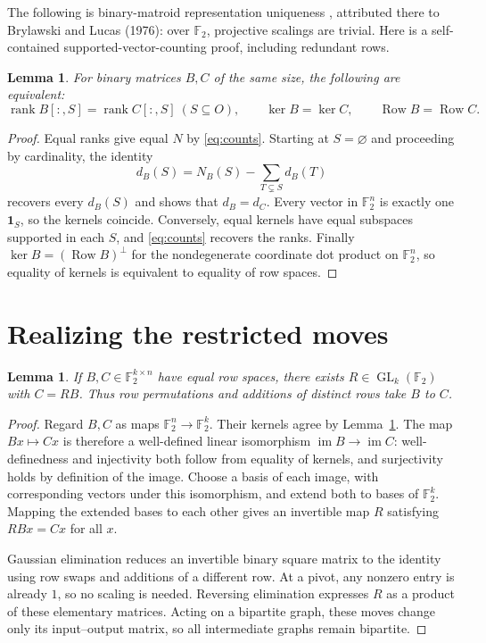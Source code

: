 \documentclass[11pt]{article}
\newtheorem{lemma}[theorem]{Lemma}
\newcommand{\F}{\mathbb F_2}
\newcommand{\rk}{\operatorname{rank}}
\newcommand{\Row}{\operatorname{Row}}
\newcommand{\GL}{\operatorname{GL}}
\begin{document}
The following is binary-matroid representation uniqueness
\cite[Proposition 6.6.5, p.~209]{Oxley}, attributed there to Brylawski
and Lucas (1976): over $\F$, projective scalings are trivial.
Here is a self-contained supported-vector-counting proof, including
redundant rows.
\begin{lemma}\label{lem:recovery}
For binary matrices $B,C$ of the same size, the following are equivalent:
\[
 \rk B[:,S]=\rk C[:,S]\ (S\subseteq O),\qquad
 \ker B=\ker C,\qquad \Row B=\Row C.
\]
\end{lemma}
\begin{proof}
Equal ranks give equal $N$ by \eqref{eq:counts}. Starting at $S=\varnothing$
and proceeding by cardinality, the identity
\[
 d_B(S)=N_B(S)-\sum_{T\subsetneq S}d_B(T)
\]
recovers every $d_B(S)$ and shows that $d_B=d_C$.
Every vector in $\F^n$ is exactly one $\mathbf1_S$, so the kernels coincide.
Conversely, equal kernels have equal subspaces supported in each $S$,
and \eqref{eq:counts} recovers the ranks. Finally
$\ker B=(\Row B)^\perp$ for the nondegenerate coordinate dot product on
$\F^n$, so equality of kernels is equivalent to equality of row spaces.
\end{proof}

\section{Realizing the restricted moves}
\begin{lemma}\label{lem:realize}
If $B,C\in\F^{k\times n}$ have equal row spaces, there exists
$R\in\GL_k(\F)$ with $C=RB$. Thus row permutations and additions of
distinct rows take $B$ to $C$.
\end{lemma}
\begin{proof}
Regard $B,C$ as maps $\F^n\to\F^k$. Their kernels agree by
Lemma~\ref{lem:recovery}. The map $Bx\mapsto Cx$ is therefore a
well-defined linear isomorphism $\operatorname{im}B\to\operatorname{im}C$:
well-definedness and injectivity both follow from equality of kernels,
and surjectivity holds by definition of the image.
Choose a basis of each image, with corresponding vectors under this
isomorphism, and extend both to bases of $\F^k$. Mapping the extended
bases to each other gives an invertible map $R$ satisfying $RBx=Cx$
for all $x$.

Gaussian elimination reduces an invertible binary square matrix to
the identity using row swaps and additions of a different row.
At a pivot, any nonzero entry is already $1$, so no scaling is needed.
Reversing elimination expresses $R$ as a product of these elementary
matrices. Acting on a bipartite graph, these moves change only its
input--output matrix, so all intermediate graphs remain bipartite.
\end{proof}
\end{document}
